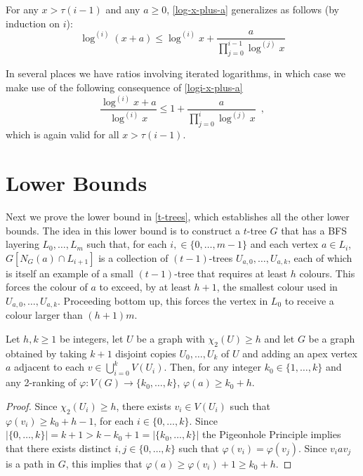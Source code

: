 \documentclass[kpfonts]{patmorin}
\newcommand{\trn}{\chi_2}
\theoremstyle{named}
\begin{document}
For any $x > \tau(i-1)$ and any $a\ge 0$, \cref{log-x-plus-a} generalizes as follows (by induction on $i$):
\begin{equation}
    \log^{(i)}(x+a) \le \log^{(i)} x + \frac{a}{\prod_{j=0}^{i-1}\log^{(j)} x} \label{logi-x-plus-a}
\end{equation}

In several places we have ratios involving iterated logarithms, in which case we make use of the following consequence of \cref{logi-x-plus-a}
\begin{equation}
    \frac{\log^{(i)} x+a}{\log^{(i)} x} \le 1 + \frac{a}{\prod_{j=0}^{i}\log^{(j)} x} \enspace, \label{logi-ratio}
\end{equation}
which is again valid for all $x> \tau(i-1)$.

\section{Lower Bounds}
\label{lower-bounds}

Next we prove the lower bound in \cref{t-trees}, which establishes all the other lower bounds. The idea in this lower bound is to construct a $t$-tree $G$ that has a BFS layering $L_0,\ldots,L_m$ such that, for each $i,\in\{0,\ldots,m-1\}$ and each vertex $a\in L_i$, $G[N_G(a)\cap L_{i+1}]$ is a collection of $(t-1)$-trees $U_{a,0},\ldots,U_{a,k}$, each of which is itself an example of a small $(t-1)$-tree that requires at least $h$ colours.  This forces the colour of $a$ to exceed, by at least $h+1$, the smallest colour used in $U_{a,0},\ldots,U_{a,k}$.  Proceeding bottom up, this forces the vertex in $L_0$ to receive a colour larger than $(h+1)m$.

\begin{lem}\label{apex-graph}
    Let $h,k\ge 1$ be integers, let $U$ be a graph with $\trn(U)\ge h$ and let $G$ be a graph obtained by taking $k+1$ disjoint copies $U_0,\ldots,U_k$ of $U$ and adding an apex vertex $a$ adjacent to each $v\in\bigcup_{i=0}^k V(U_i)$.  Then, for any integer $k_0\in \{1,\ldots,k\}$ and any 2-ranking of $\varphi:V(G)\to\{k_0,\ldots,k\}$, $\varphi(a) \ge k_0+h$.
\end{lem}

\begin{proof}
    Since $\trn(U_i)\ge h$, there exists $v_i\in V(U_i)$ such that $\varphi(v_i)\ge k_0+h-1$, for each $i\in\{0,\ldots,k\}$.  Since $|\{0,\ldots,k\}|=k+1>k-k_0+1=|\{k_0,\ldots,k\}|$ the Pigeonhole Principle implies that there exists distinct $i,j\in\{0,\ldots,k\}$ such that $\varphi(v_i)=\varphi(v_j)$.  Since $v_i a v_j$ is a path in $G$, this implies that $\varphi(a)\ge \varphi(v_i)+1\ge k_0+h$.
\end{proof}
\end{document}
